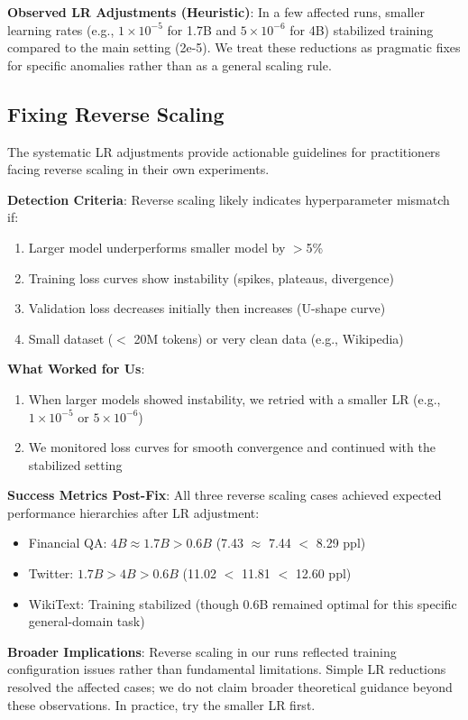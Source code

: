 \textbf{Observed LR Adjustments (Heuristic)}: In a few affected runs, smaller learning rates (e.g., $1\times10^{-5}$ for 1.7B and $5\times10^{-6}$ for 4B) stabilized training compared to the main setting (2e-5). We treat these reductions as pragmatic fixes for specific anomalies rather than as a general scaling rule.

\subsection{Fixing Reverse Scaling}

The systematic LR adjustments provide actionable guidelines for practitioners facing reverse scaling in their own experiments.

\textbf{Detection Criteria}: Reverse scaling likely indicates hyperparameter mismatch if:
\begin{enumerate}
\item Larger model underperforms smaller model by $>$5\%
\item Training loss curves show instability (spikes, plateaus, divergence)
\item Validation loss decreases initially then increases (U-shape curve)
\item Small dataset ($<$ 20M tokens) or very clean data (e.g., Wikipedia)
\end{enumerate}

\textbf{What Worked for Us}:
\begin{enumerate}
\item When larger models showed instability, we retried with a smaller LR (e.g., $1\times10^{-5}$ or $5\times10^{-6}$)
\item We monitored loss curves for smooth convergence and continued with the stabilized setting
\end{enumerate}

\textbf{Success Metrics Post-Fix}: All three reverse scaling cases achieved expected performance hierarchies after LR adjustment:
\begin{itemize}
\item Financial QA: $4B \approx 1.7B > 0.6B$ (7.43 $\approx$ 7.44 $<$ 8.29 ppl)
\item Twitter: $1.7B > 4B > 0.6B$ (11.02 $<$ 11.81 $<$ 12.60 ppl)
\item WikiText: Training stabilized (though 0.6B remained optimal for this specific general-domain task)
\end{itemize}

\textbf{Broader Implications}: Reverse scaling in our runs reflected training configuration issues rather than fundamental limitations. Simple LR reductions resolved the affected cases; we do not claim broader theoretical guidance beyond these observations. In practice, try the smaller LR first.

